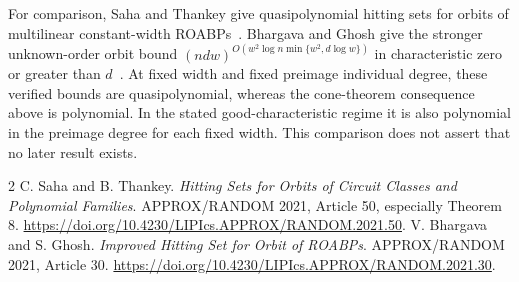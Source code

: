 \documentclass[11pt]{article}
\begin{document}
For comparison, Saha and Thankey give quasipolynomial hitting sets for
orbits of multilinear constant-width ROABPs~\cite{ST21}.
Bhargava and Ghosh give the stronger unknown-order orbit bound
$(ndw)^{O(w^2\log n\min\{w^2,d\log w\})}$ in characteristic zero or
greater than $d$~\cite{BG21}. At fixed width and fixed preimage individual
degree, these verified bounds are quasipolynomial, whereas the
cone-theorem consequence above is polynomial. In the stated
good-characteristic regime it is also polynomial in the preimage degree
for each fixed width. This comparison does not
assert that no later result exists.

\begin{thebibliography}{2}
C. Saha and B. Thankey.
\emph{Hitting Sets for Orbits of Circuit Classes and Polynomial Families}.
APPROX/RANDOM 2021, Article 50, especially Theorem 8.
\url{https://doi.org/10.4230/LIPIcs.APPROX/RANDOM.2021.50}.
V. Bhargava and S. Ghosh.
\emph{Improved Hitting Set for Orbit of ROABPs}.
APPROX/RANDOM 2021, Article 30.
\url{https://doi.org/10.4230/LIPIcs.APPROX/RANDOM.2021.30}.
\end{thebibliography}
\end{document}
